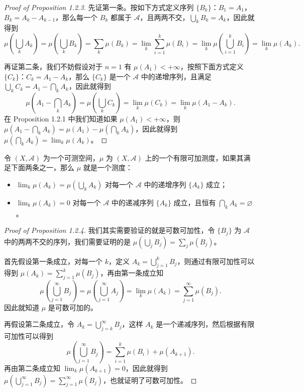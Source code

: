 \documentclass[11pt]{article}
\newcommand{\calA}{\mathcal{A}}
\newcommand{\diam}{\varnothing}
\begin{document}
\begin{proof}[Proof of Proposition 1.2.3]
    先证第一条。按如下方式定义序列 $\{B_k\}$：$B_1=A_1$，$B_k=A_k-A_{k-1}$，那么每一个 $B_k$ 都属于 $\calA$，且两两不交，$\bigcup_k B_k = A_k$，因此就得到
    \[
        \mu\left(\bigcup_k A_k\right)
        = \mu\left(\bigcup_k B_k\right)
        = \sum_k \mu(B_k)
        = \lim_k \sum_{i=1}^k \mu(B_i)
        = \lim_k \mu\left(\bigcup_{i=1}^k B_i\right)
        = \lim_k \mu(A_k).
    \]

    再证第二条，我们不妨假设对于 $n=1$ 有 $\mu(A_1) < +\infty$，按照下面方式定义 $\{C_k\}$：$C_k=A_1-A_k$，那么 $\{C_k\}$ 是一个 $\calA$ 中的递增序列，且满足 $\bigcup_k C_k = A_1 - \bigcap_k A_k$，因此就得到
    \[
        \mu\left(A_1 - \bigcap_k A_k\right)
        = \mu\left(\bigcup_k C_k\right)
        = \lim_k \mu(C_k)
        = \lim_k \mu(A_1-A_k).
    \]
    在 Proposition 1.2.1 中我们知道如果 $\mu(A_1) < +\infty$，则 $\mu\left(A_1-\bigcap_k A_k\right)=\mu(A_1)-\mu\left(\bigcap_k A_k\right)$，因此就得到 $\mu\left(\bigcap_k A_k\right)=\lim_k \mu(A_k)$。
\end{proof}

\begin{proposition}
    令 $(X,\calA)$ 为一个可测空间，$\mu$ 为 $(X,\calA)$ 上的一个有限可加测度，如果其满足下面两条之一，那么 $\mu$ 就是一个测度：
    \begin{itemize}
        \item $\lim_k \mu(A_k) = \mu\left(\bigcup_k A_k\right)$ 对每一个 $\calA$ 中的递增序列 $\{A_k\}$ 成立；
        \item $\lim_k \mu(A_k) = 0$ 对每一个 $\calA$ 中的递减序列 $\{A_k\}$ 成立，且恒有 $\bigcap_k A_k = \diam$。
    \end{itemize}
\end{proposition}

\begin{proof}[Proof of Proposition 1.2.4]
    我们其实需要验证的就是可数可加性，令 $\{B_j\}$ 为 $\calA$ 中的两两不交的序列，我们需要证明的是 $\mu\left(\bigcup_j B_j\right)=\sum_j \mu(B_j)$。

    首先假设第一条成立，对每一个 $k$，定义 $A_k=\bigcup_{j=1}^k B_j$，则通过有限可加性可以得到 $\mu(A_k)=\sum_{j=1}^k \mu(B_j)$，再由第一条成立知
    \[
        \mu\left(\bigcup_{j=1}^{\infty} B_j\right)
        = \mu\left(\bigcup_{j=1}^{\infty} A_j\right)
        = \lim_k \mu(A_k)
        = \sum_{j=1}^{\infty} \mu(B_j).
    \]
    因此就知道 $\mu$ 是可数可加的。

    再假设第二条成立，令 $A_k=\bigcup_{j=k}^{\infty} B_j$，这样 $A_k$ 是一个递减序列，然后根据有限可加性可以得到
    \[
        \mu\left(\bigcup_{j=1}^{\infty} B_j\right)
        = \sum_{i=1}^k \mu(B_i) + \mu(A_{k+1}).
    \]
    再由第二条成立知 $\lim_k \mu(A_{k+1})=0$，因此就得到 $\mu\left(\bigcup_{j=1}^{\infty} B_j\right)=\sum_{j=1}^{\infty} \mu(B_j)$，也就证明了可数可加性。
\end{proof}
\end{document}
